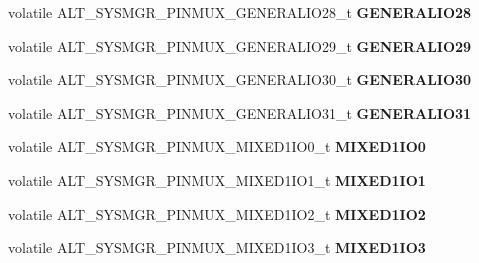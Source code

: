 \begin{DoxyCompactItemize}
volatile A\+L\+T\+\_\+\+S\+Y\+S\+M\+G\+R\+\_\+\+P\+I\+N\+M\+U\+X\+\_\+\+G\+E\+N\+E\+R\+A\+L\+I\+O28\+\_\+t {\bfseries G\+E\+N\+E\+R\+A\+L\+I\+O28}
\item 
\mbox{\label{structALT__SYSMGR__PINMUX__s_a03568a7defc20336a2c7227307fc9e07}} 
volatile A\+L\+T\+\_\+\+S\+Y\+S\+M\+G\+R\+\_\+\+P\+I\+N\+M\+U\+X\+\_\+\+G\+E\+N\+E\+R\+A\+L\+I\+O29\+\_\+t {\bfseries G\+E\+N\+E\+R\+A\+L\+I\+O29}
\item 
\mbox{\label{structALT__SYSMGR__PINMUX__s_a4c2914988f8e8b07f5d5dee6dfea00da}} 
volatile A\+L\+T\+\_\+\+S\+Y\+S\+M\+G\+R\+\_\+\+P\+I\+N\+M\+U\+X\+\_\+\+G\+E\+N\+E\+R\+A\+L\+I\+O30\+\_\+t {\bfseries G\+E\+N\+E\+R\+A\+L\+I\+O30}
\item 
\mbox{\label{structALT__SYSMGR__PINMUX__s_a8ae2d69ca66fda98a51b6c6fc783ca63}} 
volatile A\+L\+T\+\_\+\+S\+Y\+S\+M\+G\+R\+\_\+\+P\+I\+N\+M\+U\+X\+\_\+\+G\+E\+N\+E\+R\+A\+L\+I\+O31\+\_\+t {\bfseries G\+E\+N\+E\+R\+A\+L\+I\+O31}
\item 
\mbox{\label{structALT__SYSMGR__PINMUX__s_adb6f79307c79bf442a12cff09877b8c1}} 
volatile A\+L\+T\+\_\+\+S\+Y\+S\+M\+G\+R\+\_\+\+P\+I\+N\+M\+U\+X\+\_\+\+M\+I\+X\+E\+D1\+I\+O0\+\_\+t {\bfseries M\+I\+X\+E\+D1\+I\+O0}
\item 
\mbox{\label{structALT__SYSMGR__PINMUX__s_af06c896d0476a55af9fd5aa21ac75e37}} 
volatile A\+L\+T\+\_\+\+S\+Y\+S\+M\+G\+R\+\_\+\+P\+I\+N\+M\+U\+X\+\_\+\+M\+I\+X\+E\+D1\+I\+O1\+\_\+t {\bfseries M\+I\+X\+E\+D1\+I\+O1}
\item 
\mbox{\label{structALT__SYSMGR__PINMUX__s_acc2afabe570e489eaef63447b24b8b14}} 
volatile A\+L\+T\+\_\+\+S\+Y\+S\+M\+G\+R\+\_\+\+P\+I\+N\+M\+U\+X\+\_\+\+M\+I\+X\+E\+D1\+I\+O2\+\_\+t {\bfseries M\+I\+X\+E\+D1\+I\+O2}
\item 
\mbox{\label{structALT__SYSMGR__PINMUX__s_affd75b7fb363ca07303586f23e169b71}} 
volatile A\+L\+T\+\_\+\+S\+Y\+S\+M\+G\+R\+\_\+\+P\+I\+N\+M\+U\+X\+\_\+\+M\+I\+X\+E\+D1\+I\+O3\+\_\+t {\bfseries M\+I\+X\+E\+D1\+I\+O3}
\item 
\mbox{\label{structALT__SYSMGR__PINMUX__s_a545b703be7de3b272740d0dcabb64e2e}} 

\end{DoxyCompactItemize}
